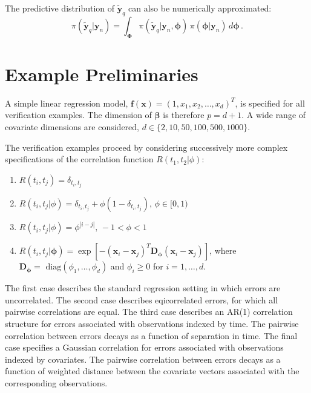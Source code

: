 \documentclass[11pt, oneside]{article}   	%
\begin{document}
The predictive distribution of $\tilde{\mathbf{y}}_q$ can also be numerically approximated:
\[
\pi(\tilde{\mathbf{y}}_q | \mathbf{y}_n) = \int_\mathbf{\Phi} \pi(\tilde{\mathbf{y}}_q | \mathbf{y}_n, \mathbf{\phi}) \, \pi(\mathbf{\phi} | \mathbf{y}_n) \, d\mathbf{\phi} \,.
\]

\section{Example Preliminaries}

A simple linear regression model, $\mathbf{f}(\mathbf{x}) = (1,x_1,x_2,\ldots,x_d)^T$, is specified for all verification examples.  The dimension of $\mathbf{\beta}$ is therefore $p=d+1$.  A wide range of covariate dimensions are considered, $d \in \{ 2, 10, 50, 100, 500, 1000 \}$.

The verification examples proceed by considering successively more complex specifications of the correlation function $R(t_1, t_2 | \phi)$:
\begin{enumerate}
\item $R(t_i, t_j ) = \delta_{t_i, t_j}$
\item $R(t_i, t_j | \phi) = \delta_{t_i, t_j}+\phi(1-\delta_{t_i,t_j}), \, \phi \in [0,1)$
\item $R(t_i,t_j | \phi) = \phi^{|i-j|}, \, -1 < \phi < 1$
\item $R(t_i,t_j | \mathbf{\phi}) = \exp \left[ -(\mathbf{x}_i - \mathbf{x}_j)^T \mathbf{D}_\mathbf{\phi} (\mathbf{x}_i - \mathbf{x}_j) \right]$, where $\mathbf{D}_\mathbf{\phi} = \mbox{ diag}(\phi_1, \ldots, \phi_d)$ and $\phi_i \ge 0$ for $i=1,\ldots, d$.
\end{enumerate}
The first case describes the standard regression setting in which errors are uncorrelated.  The second case describes eqicorrelated errors, for which all pairwise correlations are equal.  The third case describes an AR(1) correlation structure for errors associated with observations indexed by time.  The pairwise correlation between errors decays as a function of separation in time.  The final case specifies a Gaussian correlation for errors associated with observations indexed by covariates.  The pairwise correlation between errors decays as   a function of weighted distance between the covariate vectors associated with the corresponding observations.
\end{document}

